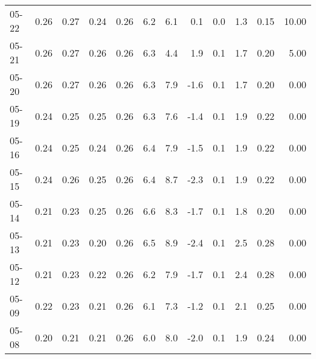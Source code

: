\begin{threeparttable}
{\begin{tabular}{lrrrrrrrrrrr}
  05-22 &          0.26 &          0.27 &          0.24 &        0.26 &                 6.2 &                 6.1 &        0.1 &                 0.0 &              1.3 &            0.15 &                  10.00 \\
  05-21 &          0.26 &          0.27 &          0.26 &        0.26 &                 6.3 &                 4.4 &        1.9 &                 0.1 &              1.7 &            0.20 &                   5.00 \\
  05-20 &          0.26 &          0.27 &          0.26 &        0.26 &                 6.3 &                 7.9 &       -1.6 &                 0.1 &              1.7 &            0.20 &                   0.00 \\
  05-19 &          0.24 &          0.25 &          0.25 &        0.26 &                 6.3 &                 7.6 &       -1.4 &                 0.1 &              1.9 &            0.22 &                   0.00 \\
  05-16 &          0.24 &          0.25 &          0.24 &        0.26 &                 6.4 &                 7.9 &       -1.5 &                 0.1 &              1.9 &            0.22 &                   0.00 \\
  05-15 &          0.24 &          0.26 &          0.25 &        0.26 &                 6.4 &                 8.7 &       -2.3 &                 0.1 &              1.9 &            0.22 &                   0.00 \\
  05-14 &          0.21 &          0.23 &          0.25 &        0.26 &                 6.6 &                 8.3 &       -1.7 &                 0.1 &              1.8 &            0.20 &                   0.00 \\
  05-13 &          0.21 &          0.23 &          0.20 &        0.26 &                 6.5 &                 8.9 &       -2.4 &                 0.1 &              2.5 &            0.28 &                   0.00 \\
  05-12 &          0.21 &          0.23 &          0.22 &        0.26 &                 6.2 &                 7.9 &       -1.7 &                 0.1 &              2.4 &            0.28 &                   0.00 \\
  05-09 &          0.22 &          0.23 &          0.21 &        0.26 &                 6.1 &                 7.3 &       -1.2 &                 0.1 &              2.1 &            0.25 &                   0.00 \\
  05-08 &          0.20 &          0.21 &          0.21 &        0.26 &                 6.0 &                 8.0 &       -2.0 &                 0.1 &              1.9 &            0.24 &                   0.00 \\

\end{tabular}}
\end{threeparttable}
